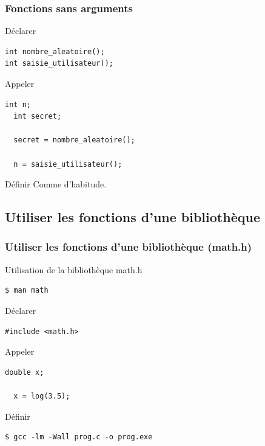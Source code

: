 \documentclass[xcolor=pdftex,svgnames,table]{beamer}
\begin{document}
\begin{frame}[fragile]
  \frametitle{Fonctions sans arguments}

 \begin{block}{Déclarer}
    \begin{lstlisting}[basicstyle=\ttfamily\small] 
int nombre_aleatoire();
int saisie_utilisateur();
     \end{lstlisting}
  \end{block}

  \begin{block}{Appeler}
  \begin{lstlisting}[basicstyle=\ttfamily\small] 
  int n;
  int secret;

  secret = nombre_aleatoire();

  n = saisie_utilisateur();
   \end{lstlisting}  
  \end{block}

  \begin{block}{Définir}
Comme d'habitude.
\end{block}
\end{frame}

\subsection[math.h]{Utiliser les fonctions d'une bibliothèque}

\begin{frame}[fragile]
  \frametitle{Utiliser les fonctions d'une bibliothèque (math.h)}
Utilisation de la bibliothèque math.h 
\begin{verbatim}
$ man math
\end{verbatim}
  \begin{block}{Déclarer}
    \begin{lstlisting}[basicstyle=\ttfamily\small] 
#include <math.h>
     \end{lstlisting}
  \end{block}

  \begin{block}{Appeler}
  \begin{lstlisting}[basicstyle=\ttfamily\small] 
  double x;

  x = log(3.5);
    \end{lstlisting}  
  \end{block}

  \begin{block}{Définir}
\begin{verbatim}
$ gcc -lm -Wall prog.c -o prog.exe
\end{verbatim}
 \end{block}
\end{frame}
\end{document}
